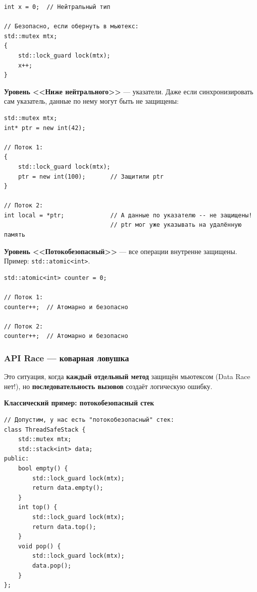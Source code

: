 \documentclass[a4paper,12pt]{article}
\begin{document}
\begin{lstlisting}
int x = 0;  // Нейтральный тип

// Безопасно, если обернуть в мьютекс:
std::mutex mtx;
{
    std::lock_guard lock(mtx);
    x++;
}
\end{lstlisting}

\textbf{Уровень <<Ниже нейтрального>>} --- указатели. Даже если синхронизировать
сам указатель, данные по нему могут быть не защищены:

\begin{lstlisting}
std::mutex mtx;
int* ptr = new int(42);

// Поток 1:
{
    std::lock_guard lock(mtx);
    ptr = new int(100);       // Защитили ptr
}

// Поток 2:
int local = *ptr;             // А данные по указателю -- не защищены!
                              // ptr мог уже указывать на удалённую память
\end{lstlisting}

\textbf{Уровень <<Потокобезопасный>>} --- все операции внутренне защищены.
Пример: \texttt{std::atomic<int>}.

\begin{lstlisting}
std::atomic<int> counter = 0;

// Поток 1:
counter++;  // Атомарно и безопасно

// Поток 2:
counter++;  // Атомарно и безопасно
\end{lstlisting}

\subsubsection{API Race --- коварная ловушка}

Это ситуация, когда \textbf{каждый отдельный метод} защищён мьютексом
(Data Race нет!), но \textbf{последовательность вызовов} создаёт логическую ошибку.

\textbf{Классический пример: потокобезопасный стек}

\begin{lstlisting}
// Допустим, у нас есть "потокобезопасный" стек:
class ThreadSafeStack {
    std::mutex mtx;
    std::stack<int> data;
public:
    bool empty() {
        std::lock_guard lock(mtx);
        return data.empty();
    }
    int top() {
        std::lock_guard lock(mtx);
        return data.top();
    }
    void pop() {
        std::lock_guard lock(mtx);
        data.pop();
    }
};
\end{lstlisting}
\end{document}
